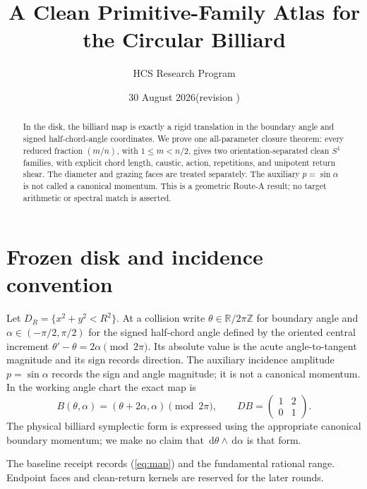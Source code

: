 \documentclass[10pt]{article}
\title{A Clean Primitive-Family Atlas for the Circular Billiard}
\author{HCS Research Program}
\date{30 August 2026\quad (revision \CRevisionRound)}
\newcommand{\R}{\mathbb R}
\newcommand{\dd}{\,\mathrm d}
\begin{document}
\maketitle
\begin{abstract}
In the disk, the billiard map is exactly a rigid translation in the boundary
angle and signed half-chord-angle coordinates.  We prove one all-parameter
closure theorem: every reduced fraction \((m/n)\), with
\(1\le m<n/2\), gives two orientation-separated clean \(S^1\) families,
with explicit chord length,
caustic, action, repetitions, and unipotent return shear.  The diameter and
grazing faces are treated separately.  The auxiliary \(p=\sin\alpha\) is not
called a canonical momentum.  This is a geometric Route-A result; no target
arithmetic or spectral match is asserted.
\end{abstract}

\section{Frozen disk and incidence convention}
Let \(D_R=\{x^2+y^2<R^2\}\).  At a collision write
\(\theta\in\R/2\pi\mathbb Z\)
for boundary angle and \(\alpha\in(-\pi/2,\pi/2)\) for the signed half-chord
angle defined by the oriented central increment
\(\theta'-\theta=2\alpha\pmod {2\pi}\).  Its absolute value is the acute
angle-to-tangent magnitude and its sign records direction.  The auxiliary
incidence amplitude
\(p=\sin\alpha\) records the sign and angle magnitude; it is not a
canonical momentum.  In the working angle chart the exact map is
\begin{equation}
 B(\theta,\alpha)=(\theta+2\alpha,\alpha)\pmod {2\pi},
 \qquad DB=\begin{pmatrix}1&2\\0&1\end{pmatrix}.       \label{eq:map}
\end{equation}
The physical billiard symplectic form is expressed using the appropriate
canonical boundary momentum; we make no claim that
\(\dd\theta\wedge\dd\alpha\) is that form.

\ifnum{}
The baseline receipt records (\ref{eq:map}) and the fundamental rational
range.  Endpoint faces and clean-return kernels are reserved for the later
rounds.
\fi
\end{document}
